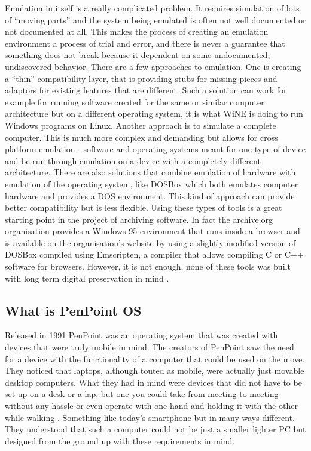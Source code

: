 Emulation in itself is a really complicated problem. It requires simulation of
lots of ``moving parts'' and the system being emulated is often not well
documented or not documented at all. This makes the process of creating an
emulation environment a process of trial and error, and there is never
a guarantee that something does not break because it dependent on some
undocumented, undiscovered behavior. There are a few approaches to emulation.
One is creating a ``thin'' compatibility layer, that is providing stubs for
missing pieces and adaptors for existing features that are different. Such
a solution can work for example for running software created for the same or
similar computer architecture but on a different operating system, it is what
WiNE is doing to run Windows programs on Linux. Another approach is to simulate
a complete computer. This is much more complex and demanding but allows for
cross platform emulation - software and operating systems meant for one type of
device and be run through emulation on a device with a completely different
architecture. There are also solutions that combine emulation of hardware with
emulation of the operating system, like DOSBox which both emulates computer
hardware and provides a DOS environment. This kind of approach can provide
better compatibility but is less flexible. Using these types of tools is
a great starting point in the project of archiving software. In fact the
archive.org organisation provides a Windows 95 environment that runs inside
a browser and is available on the organisation's website by using a slightly
modified version of DOSBox compiled using Emscripten, a compiler that allows
compiling C or C++ software for browsers. However, it is not enough, none of
these tools was built with long term digital preservation in mind
\cite{hoeven2007}.

\subsection{What is PenPoint OS}

Released in 1991 PenPoint was an operating system that was created with devices
that were truly mobile in mind. The creators of PenPoint saw the need for
a device with the functionality of a computer that could be used on the move.
They noticed that laptops, although touted as mobile, were actually just
movable desktop computers. What they had in mind were devices that did not have
to be set up on a desk or a lap, but one you could take from meeting to meeting
without any hassle or even operate with one hand and holding it with the other
while walking \cite{carr1991}. Something like today's smartphone but in many ways
different. They understood that such a computer could not be just a smaller
lighter PC but designed from the ground up with these requirements in mind.

